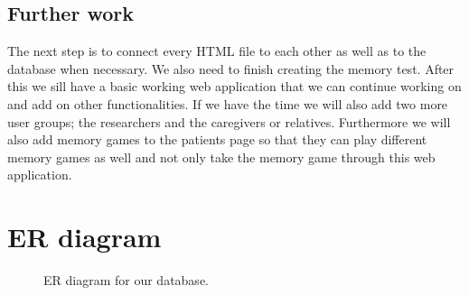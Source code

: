 \documentclass{article}
\begin{document}
\subsection{Further work}
The next step is to connect every HTML file to each other as well as to the database when necessary. We also need to finish creating the memory test. After this we sill have a basic working web application that we can continue working on and add on other functionalities.\newline
\newline If we have the time we will also add two more user groups; the researchers and the caregivers or relatives. Furthermore we will also add memory games to the patients page so that they can play different memory games as well and not only take the memory game through this web application. 




\newpage
\appendix
\section{ER diagram}
\begin{figure}[h!]
    \centering
    \caption{ER diagram for our database.}
    \label{fig:ER-diagram}
\end{figure}
\end{document}
